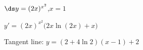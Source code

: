 {$\ds y=(2x)^{x^2}$,\quad $x=1$
}
{$y'= (2x)^{x^2}\big(2x\ln (2x)+x\big)$

Tangent line: $y = (2+4\ln 2)(x-1)+ 2$
}
